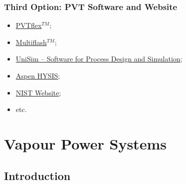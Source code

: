 \documentclass[10pt,compress,handout,unknownkeysallowed]{beamer}
\begin{document}
\begin{comment}
\end{frame}

\end{comment}


\begin{frame}
  \frametitle{Third Option: PVT Software and Website}
\noindent
\begin{itemize}
   \item<1-> \href{http://www.weatherford.com/doc/wft183650}{PVTflex$^{TM}$};
   \item<1-> \href{http://www.kbcat.com/infochem-software/flow-assurance-software-multiflash/pvt-simulation}{Multiflash$^{TM}$};
   \item<1-> \href{https://www.honeywellprocess.com/en-US/explore/products/advanced-applications/unisim/Pages/default.aspx}{UniSim – Software for Process Design and Simulation};
   \item<1-> \href{http://home.aspentech.com/products/engineering/aspen-hysys}{Aspen HYSIS};
   \item<1-> \href{http://webbook.nist.gov/chemistry/fluid/}{NIST Website};
   \item<1-> etc.
\end{itemize}

\end{frame}



\section{Vapour Power Systems}

\subsection{Introduction}

\begin{comment}
\begin{frame}
 \frametitle{Introduction to Vapour and Gas Power}
    \begin{figure}%
     \begin{center}
      \texttt{[image: ./Pics/Energy\_Share\_UK]}
     \end{center}
    \end{figure}
\vspace{-2cm}
\textcolor{blue}{Fuel used in electricity generation and electricity supplied. (\href{https://www.gov.uk/government/organisations/department-of-energy-climate-change/series/electricity-statistics}{https://www.gov.uk/government/organisations/department-of-energy-climate-change/series/electricity-statistics})}
 \normalsize
\end{frame}

\end{comment}
\end{document}
